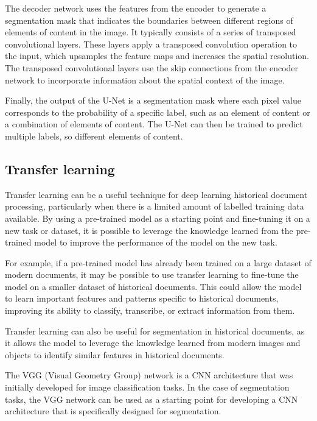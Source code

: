 \documentclass{polytech/polytech}
\numberwithin{figure}{chapter}
\begin{document}
The decoder network uses the features from the encoder to generate a segmentation mask that indicates the boundaries between different regions of elements of content in the image.
It typically consists of a series of transposed convolutional layers.
These layers apply a transposed convolution operation to the input, which upsamples the feature maps and increases the spatial resolution.
The transposed convolutional layers use the skip connections from the encoder network to incorporate information about the spatial context of the image.

Finally, the output of the U-Net is a segmentation mask where each pixel value corresponds to the probability of a specific label, such as an element of content or a combination of elements of content.
The U-Net can then be trained to predict multiple labels, so different elements of content.


\subsection{Transfer learning}

Transfer learning can be a useful technique for deep learning historical document processing, particularly when there is a limited amount of labelled training data available.
By using a pre-trained model as a starting point and fine-tuning it on a new task or dataset, it is possible to leverage the knowledge learned from the pre-trained model to improve the performance of the model on the new task.

For example, if a pre-trained model has already been trained on a large dataset of modern documents, it may be possible to use transfer learning to fine-tune the model on a smaller dataset of historical documents.
This could allow the model to learn important features and patterns specific to historical documents, improving its ability to classify, transcribe, or extract information from them.

Transfer learning can also be useful for segmentation in historical documents, as it allows the model to leverage the knowledge learned from modern images and objects to identify similar features in historical documents.


The VGG (Visual Geometry Group) network is a CNN architecture that was initially developed for image classification tasks.
In the case of segmentation tasks, the VGG network can be used as a starting point for developing a CNN architecture that is specifically designed for segmentation.
\end{document}

